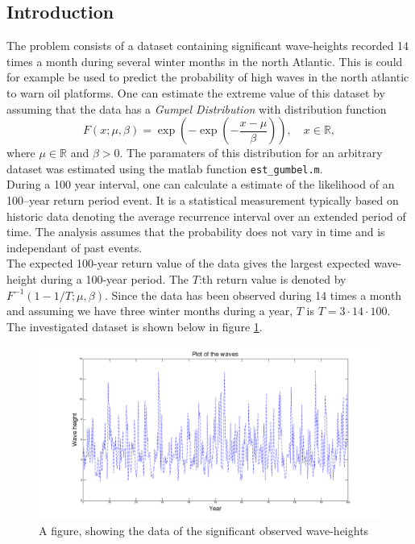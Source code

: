 \subsection*{Introduction}

The problem consists of a dataset containing significant wave-heights recorded 14 times a month during several winter months in the north Atlantic. This is could for example be used to predict the probability of high waves in the north atlantic to warn oil platforms. One can estimate the extreme value of this dataset by assuming that the data has a \textit{Gumpel Distribution} with distribution function
\[ F(x; \mu, \beta)=\exp\left(-\exp\left(-\frac{x-\mu}{\beta}\right)\right), \quad x\in\mathbb{R}, \]
where $\mu\in\mathbb{R}$ and $\beta>0$. The paramaters of this distribution for an arbitrary dataset was estimated using the matlab function \texttt{est\_gumbel.m}. \\

During a 100 year interval, one can calculate a estimate of the likelihood of an 100--year return period event. It is a statistical measurement typically based on historic data denoting the average recurrence interval over an extended period of time. The analysis assumes that the probability does not vary in time and is independant of past events. \\

The expected 100-year return value of the data gives the largest expected wave-height during a 100-year period. The $T$:th return value is denoted by $F^{-1}(1-1/T;\mu,\beta)$. Since the data has been observed during 14 times a month and assuming we have three winter months during a year, $T$ is $T=3\cdot14\cdot100$. The investigated dataset is shown below in figure \ref{fig:waves}. \\

\begin{figure}[H]
\centering
	\includegraphics[scale=0.26]{./Figures/waves.png}
\caption{A figure, showing the data of the significant observed wave-heights}
\label{fig:waves}

\end{figure}

